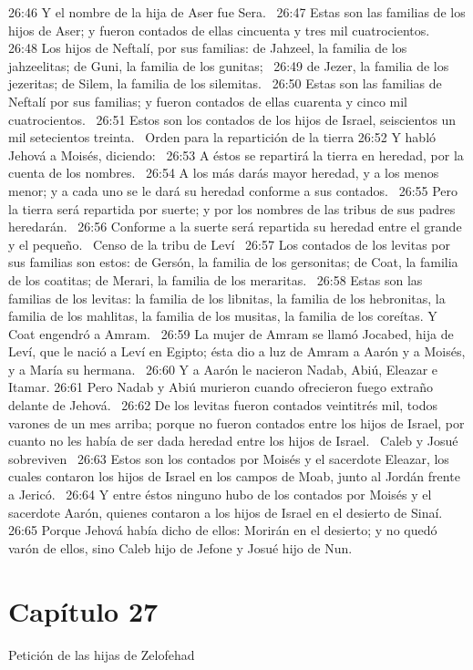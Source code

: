 26:46 Y el nombre de la hija de Aser fue Sera.  
26:47 Estas son las familias de los hijos de Aser; y fueron contados de ellas cincuenta y tres mil cuatrocientos.  
26:48 Los hijos de Neftalí, por sus familias: de Jahzeel, la familia de los jahzeelitas; de Guni, la familia de los gunitas;  
26:49 de Jezer, la familia de los jezeritas; de Silem, la familia de los silemitas.  
26:50 Estas son las familias de Neftalí por sus familias; y fueron contados de ellas cuarenta y cinco mil cuatrocientos.  
26:51 Estos son los contados de los hijos de Israel, seiscientos un mil setecientos treinta.  
Orden para la repartición de la tierra 
26:52 Y habló Jehová a Moisés, diciendo:  
26:53 A éstos se repartirá la tierra en heredad, por la cuenta de los nombres.  
26:54 A los más darás mayor heredad, y a los menos menor; y a cada uno se le dará su heredad conforme a sus contados.  
26:55 Pero la tierra será repartida por suerte; y por los nombres de las tribus de sus padres heredarán.  
26:56 Conforme a la suerte será repartida su heredad entre el grande y el pequeño.  
Censo de la tribu de Leví  
26:57 Los contados de los levitas por sus familias son estos: de Gersón, la familia de los gersonitas; de Coat, la familia de los coatitas; de Merari, la familia de los meraritas.  
26:58 Estas son las familias de los levitas: la familia de los libnitas, la familia de los hebronitas, la familia de los mahlitas, la familia de los musitas, la familia de los coreítas. Y Coat engendró a Amram.  
26:59 La mujer de Amram se llamó Jocabed, hija de Leví, que le nació a Leví en Egipto; ésta dio a luz de Amram a Aarón y a Moisés, y a María su hermana.  
26:60 Y a Aarón le nacieron Nadab, Abiú, Eleazar e Itamar. 
26:61 Pero Nadab y Abiú murieron cuando ofrecieron fuego extraño delante de Jehová.  
26:62 De los levitas fueron contados veintitrés mil, todos varones de un mes arriba; porque no fueron contados entre los hijos de Israel, por cuanto no les había de ser dada heredad entre los hijos de Israel.  
Caleb y Josué sobreviven  
26:63 Estos son los contados por Moisés y el sacerdote Eleazar, los cuales contaron los hijos de Israel en los campos de Moab, junto al Jordán frente a Jericó.  
26:64 Y entre éstos ninguno hubo de los contados por Moisés y el sacerdote Aarón, quienes contaron a los hijos de Israel en el desierto de Sinaí.  
26:65 Porque Jehová había dicho de ellos: Morirán en el desierto; y no quedó varón de ellos, sino Caleb hijo de Jefone y Josué hijo de Nun. 
\section*{Capítulo 27}
Petición de las hijas de Zelofehad  

